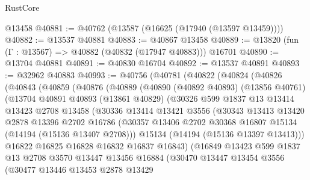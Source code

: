 \begin{lexlean}{RustCore}
\begin{coremodule}
    @13458
@40881 := @40762 (@13587 (@16625 (@17940 (@13597 @13459))))
@40882 := @13537 @40881
@40883 := @40867 @13458
@40889 := @13820 (fun (Γ : @13567) => @40882 (@40832 (@17947 @40883))) @16701
@40890 := @13704 @40881
@40891 := @40830 @16704
@40892 := @13537 @40891
@40893 := @32962 @40883
@40993 := @40756
    (@40781
      (@40822
        (@40824
          (@40826
            (@40843
              (@40859
                (@40876
                  (@40889
                    (@40890
                      (@40892 @40893)
                      (@13856 @40761)
                      (@13704
                        @40891
                        @40893
                        (@13861 @40829)
                        (@30326
                          @599
                          @1837
                          @13
                          @13414
                          @13423
                          @2708
                          @13458
                          (@30336
                            @13414
                            @13421
                            @3556
                            (@30343
                              @13413
                              @13420
                              @2878
                              @13396
                              @2702
                              @16786
                              (@30357
                                @13406
                                @2702
                                @30368
                                @16807
                                @15134
                                (@14194 (@15136 @13407 @2708)))
                              @15134
                              (@14194 (@15136 @13397 @13413)))
                            @16822
                            @16825
                            @16828
                            @16832
                            @16837
                            @16843)
                          (@16849
                            @13423
                            @599
                            @1837
                            @13
                            @2708
                            @3570
                            @13447
                            @13456
                            @16884
                            (@30470
                              @13447
                              @13454
                              @3556
                              (@30477
                                @13446
                                @13453
                                @2878
                                @13429

\end{coremodule}
\end{lexlean}
